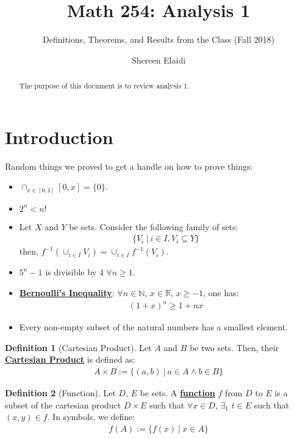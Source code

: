 \documentclass[11pt]{article}
\title{\textbf{Math 254: Analysis 1}\vspace{-2ex}}
\author{Definitions, Theorems, and Results from the Class\vspace{-2ex} (Fall 2018)}
\date{Shereen Elaidi}
\theoremstyle{definition}
\newcommand{\R}[0]{\mathbb{R}}
\newcommand{\dfn}[1]{\textbf{{\underline{#1}}}}
\theoremstyle{definition}
\newtheorem{definition}{\textcolor{OliveGreen}{Definition}}
\theoremstyle{remark}
\begin{document}
\maketitle 

\begin{abstract}
	The purpose of this document is to review analysis 1.
\end{abstract}

\section{Introduction}
Random things we proved to get a handle on how to prove things:
\begin{itemize}[noitemsep]
	\item $\cap_{x \in [0, 1] } [0,x] = \{ 0 \}$.
	\item $2^n < n!$ 
	\item Let $X$ and $Y$ be sets. Consider the following family of sets: 
	\begin{align*}
		\{ V_i\ |\ i \in I, V_i \subseteq Y \}
	\end{align*}
	then, $f^{-1} \left( \cup_{i \in I} V_i \right) = \cup_{i \in I} f^{-1}(V_i )$.
	\item $5^n -1$ is divisible by 4 $\forall n \geq 1$. 
	\item \dfn{Bernoulli's Inequality}: $\forall n \in \mathbb{N}$, $x \in \R$, $x \geq -1$, one has: 
	\begin{align}
		(1+x)^n \geq 1 + nx	
	\end{align}
	\item Every non-empty subset of the natural numbers has a smallest element. 
\end{itemize}

\begin{definition}[Cartesian Product] 
	Let $A$ and $B$ be two sets. Then, their \dfn{Cartesian Product} is defined as: 
	\begin{align}
		A \times B 	:= \{ (a,b)\ |\ a \in A \land b \in B \} 
	\end{align}
\end{definition}

\begin{definition}[Function]
	Let $D$, $E$ be sets. A \dfn{function} $f$ from $D$ to $E$ is a subset of the cartesian product $D \times E$ such that $\forall x \in D$, $\exists_1$ $t \in E$ such that $(x,y) \in f$. In symbols, we define: 
	\begin{align}
		f(A) := \{ f(x)\ |\ x \in A \} 	
	\end{align}
\end{definition}
\end{document}
